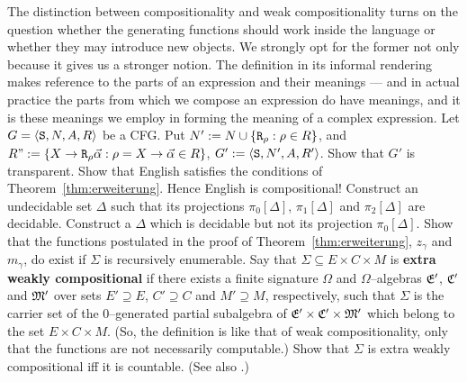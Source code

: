 The distinction between compositionality and weak compositionality
turns on the question whether the generating functions should
work inside the language or whether they may introduce new objects.
We strongly opt for the former not only because it gives us a
stronger notion. The definition in its informal rendering makes
reference to the parts of an expression and their meanings --- and 
in actual practice the parts from which we compose an expression 
do have meanings, and it is these meanings we employ in forming 
the meaning of a complex expression.
\vplatz
\exercise
\label{ex:transparent}
Let $G = \langle \mbox{\tt S}, N, A, R\rangle$ be a CFG. Put 
$N' := N \cup \{\mbox{\tt R}_{\rho} : \rho \in R\}$, and
$R" := \{X \rightarrow \mbox{\tt R}_{\rho}\vec{\alpha} : \rho = X 
	\rightarrow \vec{\alpha} \in R\}$, 
$G' := \langle \mbox{\tt S}, N', A, R'\rangle$.  
Show that $G'$ is transparent. 
\vplatz
\exercise
Show that English satisfies the conditions of
Theorem~\ref{thm:erweiterung}. Hence English
is compositional! 
\vplatz
\exercise
Construct an undecidable set $\Delta$ such that its projections 
$\pi_0[\Delta]$, $\pi_1[\Delta]$ and $\pi_2[\Delta]$ are decidable. 
Construct a $\Delta$ which is decidable but not its projection
$\pi_0[\Delta]$.
\vplatz
\exercise
Show that the functions postulated in the proof of
Theorem~\ref{thm:erweiterung}, $z_{\gamma}$ and $m_{\gamma}$,
do exist if $\Sigma$ is recursively enumerable.
\vplatz 
\exercise 
Say that $\Sigma \subseteq E \times C \times M$
is \textbf{extra weakly compositional} if there exists a finite
signature $\Omega$ and $\Omega$--algebras $\mathfrak{E}'$, $\mathfrak{C}'$ and
$\mathfrak{M}'$ over sets $E' \supseteq E$, $C' \supseteq C$ and $M'
\supseteq M$, respectively, such that $\Sigma$ is the carrier 
set of the 0--generated partial subalgebra of 
$\mathfrak{E}' \times \mathfrak{C}' \times \mathfrak{M}'$ which belong to the
set $E \times C \times M$. (So, the definition is like that of
weak compositionality, only that the functions are not
necessarily computable.) Show that $\Sigma$ is extra weakly
compositional iff it is countable. (See also
\cite{zadrozny:compositionality}.)
